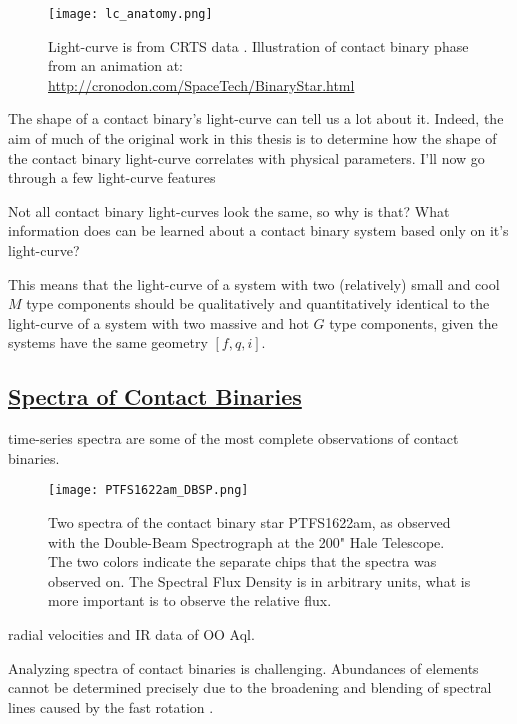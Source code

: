 \documentclass[12pt]{article} %
\numberwithin{equation}{section} %
\begin{document}
\begin{figure}[H]
\centering
\texttt{[image: lc\_anatomy.png]}
\caption{Light-curve is from CRTS data \citep{drake2014catalina}. Illustration of contact binary phase from an animation at: \url{http://cronodon.com/SpaceTech/BinaryStar.html}}
\label{fig: lc_anatomy}
\end{figure}

The shape of a contact binary's light-curve can tell us a lot about it. Indeed, the aim of much of the original work in this thesis is to determine how the shape of the contact binary light-curve correlates with physical parameters. I'll now go through a few light-curve features 

Not all contact binary light-curves look the same, so why is that? What information does can be learned about a contact binary system based only on it's light-curve?

This means that the light-curve of a system with two (relatively) small and cool $M$ type components should be qualitatively and quantitatively identical to the light-curve of a system with two massive and hot $G$ type components, given the systems have the same geometry $[f,q,i]$.

\subsection[Spectra of Contact Binaries]{\hyperlink{toc}{Spectra of Contact Binaries}} \label{sec: Spectra of Contact Binaries}

time-series spectra are some of the most complete observations of contact binaries. 

\begin{figure}[H]
\centering
\texttt{[image: PTFS1622am\_DBSP.png]}
\caption{Two spectra of the contact binary star PTFS1622am, as observed with the Double-Beam Spectrograph at the 200" Hale Telescope. The two colors indicate the separate chips that the spectra was observed on. The Spectral Flux Density is in arbitrary units, what is more important is to observe the relative flux.}
\label{fig: PTFS1622am_DBSP}
\end{figure}

\citep{hrivnak1989radial} radial velocities and IR data of OO Aql.

Analyzing spectra of contact binaries is challenging. Abundances of elements cannot be determined precisely due to the broadening and blending of spectral lines caused by the fast rotation \citep{gazeas2006masses}. 
\end{document}
